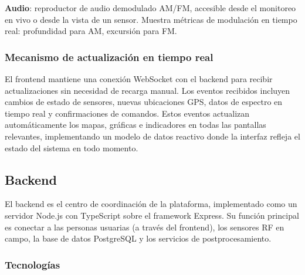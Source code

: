 \textbf{Audio}: reproductor de audio demodulado AM/FM, accesible desde el
monitoreo en vivo o desde la vista de un sensor. Muestra métricas de
modulación en tiempo real: profundidad para AM, excursión para FM.

\subsubsection*{Mecanismo de actualización en tiempo real}

El frontend mantiene una conexión WebSocket con el backend para recibir
actualizaciones sin necesidad de recarga manual. Los eventos recibidos
incluyen cambios de estado de sensores, nuevas ubicaciones GPS, datos de
espectro en tiempo real y confirmaciones de comandos. Estos eventos actualizan
automáticamente los mapas, gráficas e indicadores en todas las pantallas
relevantes, implementando un modelo de datos reactivo donde la interfaz
refleja el estado del sistema en todo momento.

\subsection{Backend}

El backend es el centro de coordinación de la plataforma, implementado como un
servidor Node.js con TypeScript sobre el framework Express. Su función
principal es conectar a las personas usuarias (a través del frontend), los
sensores RF en campo, la base de datos PostgreSQL y los servicios de
postprocesamiento.

\subsubsection*{Tecnologías}

